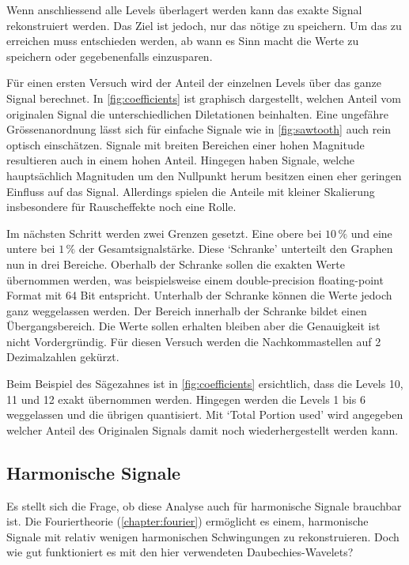 \begin{refsection}
Wenn anschliessend alle Levels überlagert werden kann das exakte Signal rekonstruiert werden.
Das Ziel ist jedoch, nur das nötige zu speichern.
Um das zu erreichen muss entschieden werden, ab wann es Sinn macht die Werte zu speichern oder gegebenenfalls einzusparen.

Für einen ersten Versuch wird der Anteil der einzelnen Levels über das ganze Signal berechnet.
In \autoref{fig:coefficients} ist graphisch dargestellt, welchen Anteil vom originalen Signal die unterschiedlichen Diletationen beinhalten.
Eine ungefähre Grössenanordnung lässt sich für einfache Signale wie in \autoref{fig:sawtooth} auch rein optisch einschätzen.
Signale mit breiten Bereichen einer hohen Magnitude resultieren auch in einem hohen Anteil. 
Hingegen haben Signale, welche hauptsächlich Magnituden um den Nullpunkt herum besitzen einen eher geringen Einfluss auf das Signal.
Allerdings spielen die Anteile mit kleiner Skalierung insbesondere für Rauscheffekte noch eine Rolle.

Im nächsten Schritt werden zwei Grenzen gesetzt.
Eine obere bei  $10\,\text{\%}$ und eine untere bei $1\,\text{\%}$ der Gesamtsignalstärke.
Diese `Schranke' unterteilt den Graphen nun in drei Bereiche. 
Oberhalb der Schranke sollen die exakten Werte übernommen werden, was beispielsweise einem double-precision floating-point Format mit 64 Bit entspricht.
Unterhalb der Schranke können die Werte jedoch ganz weggelassen werden.
Der Bereich innerhalb der Schranke bildet einen Übergangsbereich.
Die Werte sollen erhalten bleiben aber die Genauigkeit ist nicht Vordergründig.
Für diesen Versuch werden die Nachkommastellen auf 2 Dezimalzahlen gekürzt. 

Beim Beispiel des Sägezahnes ist in \autoref{fig:coefficients} ersichtlich, dass die Levels 10, 11 und 12 exakt übernommen werden.
Hingegen werden die Levels 1 bis 6 weggelassen und die übrigen quantisiert.
Mit `Total Portion used' wird angegeben welcher Anteil des Originalen Signals damit noch wiederhergestellt werden kann.

\subsection{Harmonische Signale}
Es stellt sich die Frage, ob diese Analyse auch für harmonische Signale brauchbar ist.
Die Fouriertheorie (\autoref{chapter:fourier}) ermöglicht es einem, harmonische Signale mit relativ wenigen harmonischen Schwingungen zu rekonstruieren.
Doch wie gut funktioniert es mit den hier verwendeten Daubechies-Wavelets?


\end{refsection}
